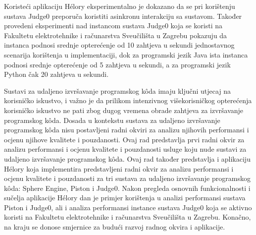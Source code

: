 \documentclass[times, utf8, diplomski]{fer}
\begin{document}
Koristeći aplikaciju Hélory eksperimentalno je dokazano da se pri korištenju sustava Judge0 preporuča koristiti asinkronu interakciju sa sustavom. Također provedeni eksperimenti nad instancom sustava Judge0 koja se koristi na Fakultetu elektrotehnike i računarstva Sveučilišta u Zagrebu pokazuju da instanca podnosi srednje opterećenje od 10 zahtjeva u sekundi jednostavnog scenarija korištenja u  implementaciji, dok za programski jezik Java ista instanca podnosi srednje opterećenje od 5 zahtjeva u sekundi, a za programski jezik Python čak 20 zahtjeva u sekundi.




\begin{sazetak}
Sustavi za udaljeno izvršavanje programskog kôda imaju ključni utjecaj na korisničko iskustvo, i važno je da prilikom intenzivnog višekorisničkog opterećenja korisničko iskustvo ne pati zbog dugog vremena obrade zahtjeva za izvršavanje programskog kôda. Dosada u kontekstu sustava za udaljeno izvršavanje programskog kôda nisu postavljeni radni okviri za analizu njihovih performansi i ocjenu njihove kvalitete i pouzdanosti. Ovaj rad predstavlja prvi radni okvir za analizu performansi i ocjenu kvalitete i pouzdanosti usluge koju nude sustavi za udaljeno izvršavanje programskog kôda. Ovaj rad također predstavlja i aplikaciju Hélory koja implementira predstavljeni radni okvir za analizu performansi i ocjenu kvalitete i pouzdanosti za tri sustava za udaljeno izvršavanje programskog kôda: Sphere Engine, Piston i Judge0. Nakon pregleda osnovnih funkcionalnosti i sučelja aplikacije Hélory dan je primjer korištenja u analizi performansi sustava Piston i Judge0, ali i analiza performansi instance sustava Judge0 koja se aktivno koristi na Fakultetu elektrotehnike i računarstva Sveučilišta u Zagrebu. Konačno, na kraju se donose smjernice za budući razvoj radnog okvira i aplikacije.

\end{sazetak}

\pagebreak
\end{document}
